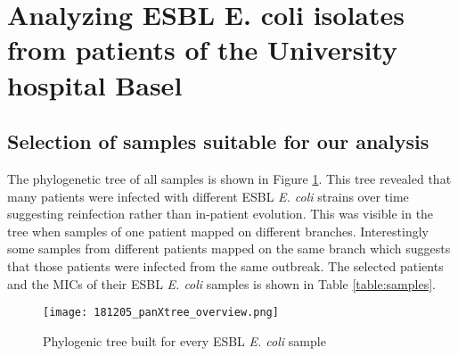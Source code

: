 \section{Analyzing ESBL E. coli isolates from patients of the University hospital Basel}
\subsection{Selection of samples suitable for our analysis}
The phylogenetic tree of all samples is shown in Figure \ref{figure:panX}. This tree revealed that many patients were infected with different ESBL \textit{E. coli} strains over time suggesting reinfection rather than in-patient evolution. This was visible in the tree when samples of one patient mapped on different branches. Interestingly some samples from different patients mapped on the same branch which suggests that those patients were infected from the same outbreak. The selected patients and the MICs of their ESBL \textit{E. coli} samples is shown in Table \ref{table:samples}.

\begin{figure}[H]
	\texttt{[image: 181205\_panXtree\_overview.png]}
	\caption{Phylogenic tree built for every ESBL \textit{E. coli} sample}
	\label{figure:panX}
\end{figure}

